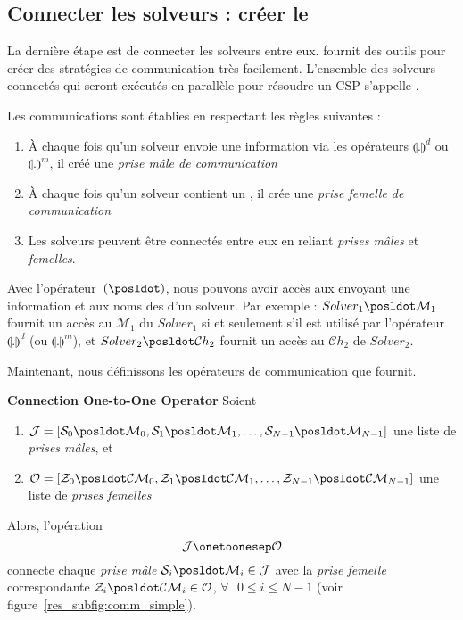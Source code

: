 \subsection{Connecter les solveurs : créer le \soset}

La dernière étape est de connecter les solveurs entre eux. \posl{} fournit des outils pour créer des stratégies de communication très facilement. L'ensemble des solveurs connectés qui seront exécutés en parallèle pour résoudre un CSP s'appelle \INTROsoset{}.

Les communications sont établies en respectant les règles suivantes :
\begin{enumerate}
\item  À chaque  fois qu'un  solveur  envoie une information via les opérateurs  $\llparenthesis .\rrparenthesis^{d}$  ou $\llparenthesis   .\rrparenthesis^{m}$, il créé une {\it prise mâle de communication} 
\item À chaque fois qu'un  solveur contient un \opch{}, il  crée une {\it prise femelle de communication} 
\item Les solveurs peuvent être connectés entre eux en reliant {\it prises mâles} et {\it femelles}.
\end{enumerate}

Avec l'opérateur~$(\posldot)$, nous  pouvons avoir accès aux \oms{} envoyant une information et aux noms des \opchs{} d'un solveur. Par exemple : $Solver_1\posldot\mathcal{M}_1$ fournit un accès au \om{} $\mathcal{M}_1$ du $Solver_1$ si et seulement s'il est utilisé par l'opérateur  $\llparenthesis .\rrparenthesis^{d}$  (ou $\llparenthesis.\rrparenthesis^{m}$), et $Solver_2\posldot\mathcal{C}h_2$ fournit un accès au \opch{} $\mathcal{C}h_2$ de $Solver_2$.

Maintenant, nous définissons les opérateurs de communication que \posl{} fournit.

\begin{lemma}\label{res_op_conn:1to1}
{\bf Connection One-to-One Operator} Soient
\begin{enumerate}
\item $\mathcal{J} = \left[\mathcal{S}_0\posldot \mathcal{M}_0, \mathcal{S}_1\posldot \mathcal{M}_1,\dots, \mathcal{S}_{N-1}\posldot \mathcal{M}_{N-1}\right]$ une liste de  {\it prises mâles}, et
\item $\mathcal{O} = \left[\mathcal{Z}_0\posldot \mathcal{CM}_0, \mathcal{Z}_1\posldot \mathcal{CM}_1,\dots, \mathcal{Z}_{N-1}\posldot \mathcal{CM}_{N-1}\right]$ une liste de {\it prises femelles}
\end{enumerate} Alors, l'opération
\[
\mathcal{J} \onetoonesep \mathcal{O}
\]
connecte chaque {\it prise mâle} $\mathcal{S}_i\posldot \mathcal{M}_i \in \mathcal{J}$ avec la {\it prise femelle} correspondante $\mathcal{Z}_i\posldot \mathcal{CM}_i \in \mathcal{O}$, $\forall\textbf{ }0 \leq i \leq N-1$ (voir figure~\ref{res_subfig:comm_simple}).
\end{lemma}


